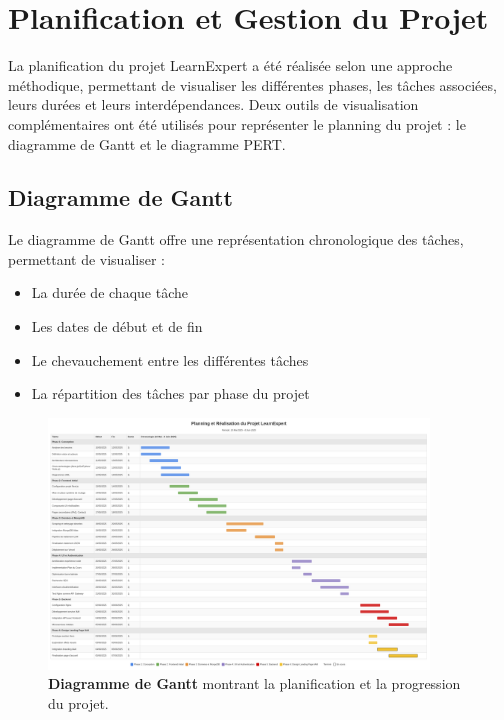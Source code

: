 \section{Planification et Gestion du Projet}

La planification du projet LearnExpert a été réalisée selon une approche méthodique, permettant de visualiser les différentes phases, les tâches associées, leurs durées et leurs interdépendances. Deux outils de visualisation complémentaires ont été utilisés pour représenter le planning du projet : le diagramme de Gantt et le diagramme PERT.

\subsection{Diagramme de Gantt}

Le diagramme de Gantt offre une représentation chronologique des tâches, permettant de visualiser :
\begin{itemize}[leftmargin=*,noitemsep,topsep=0pt]
  \item La durée de chaque tâche
  \item Les dates de début et de fin
  \item Le chevauchement entre les différentes tâches
  \item La répartition des tâches par phase du projet
\end{itemize}

\begin{figure}[htb]
  \centering
  \includegraphics[width=0.9\textwidth,keepaspectratio]{images/gestion_projet/gantt_diagram.png}
  \caption{\textbf{Diagramme de Gantt} montrant la planification et la progression du projet.}
  \label{fig:gantt_diagram}
\end{figure}

